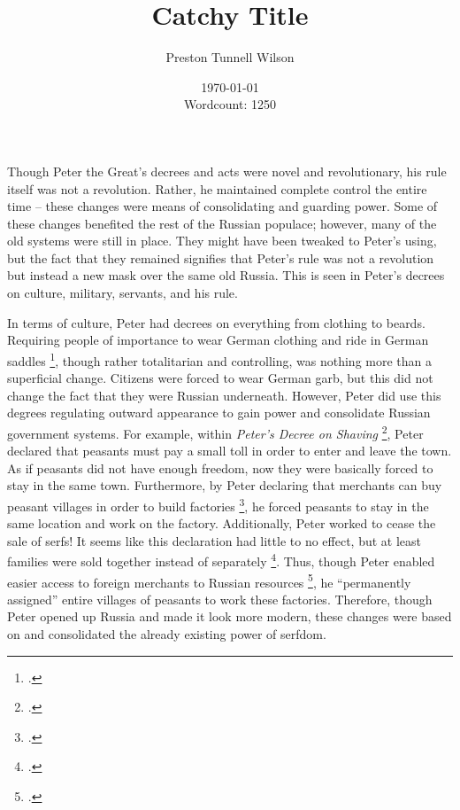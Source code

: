 \documentclass[titlepage]{article}
\begin{document}
\title{
    Catchy Title
}

\author{
Preston Tunnell Wilson }

\date{
\today \\
Wordcount: 1250}

\maketitle
Though Peter the Great's decrees and acts were novel and revolutionary,
his rule itself was not a revolution.
Rather, he maintained complete control the entire time -- 
these changes were means of consolidating and guarding power.
Some of these changes benefited the rest of the Russian populace;
however, many of the old systems were still in place.
They might have been tweaked to Peter's using,
but the fact that they remained signifies that Peter's rule was not a revolution
but instead a new mask over the same old Russia.
This is seen in Peter's decrees on culture, military, servants, and his rule.

In terms of culture, Peter had decrees on everything from clothing to beards.
Requiring people of importance to wear German clothing and ride in German saddles
\footcite[110]{decrees}, though rather totalitarian and controlling,
was nothing more than a superficial change.
Citizens were forced to wear German garb,
but this did not change the fact that they were Russian underneath.
However, Peter did use this degrees regulating outward appearance to gain power 
and consolidate Russian government systems.
For example, within \emph{Peter's Decree on Shaving} \footcite[111]{decrees},
Peter declared that peasants must pay a small toll in order to enter and leave the town.
As if peasants did not have enough freedom, now they were basically forced to stay in the same town.
Furthermore, by Peter declaring that merchants can buy peasant villages
in order to build factories \footcite[113]{decrees}, he forced peasants to stay in the same location
and work on the factory.
Additionally, Peter worked to cease the sale of serfs!
It seems like this declaration had little to no effect,
but at least families were sold together instead of separately \footcite[113]{decrees}.
Thus, though Peter enabled easier access to foreign merchants to Russian resources \footcite[116]{decrees},
he ``permanently assigned'' entire villages of peasants to work these factories.
Therefore, though Peter opened up Russia and made it look more modern,
these changes were based on and consolidated the already existing power of serfdom.
\end{document}
